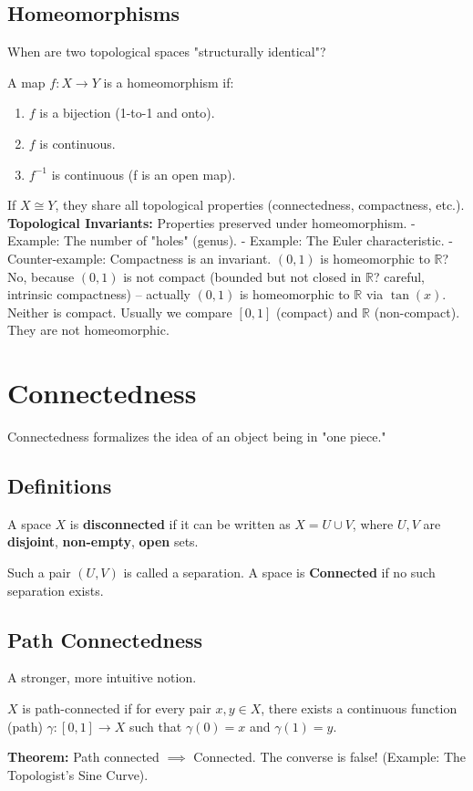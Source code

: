 \subsection{Homeomorphisms}
When are two topological spaces "structurally identical"?
\begin{definition}[Homeomorphism]
A map $f: X \to Y$ is a homeomorphism if:
\begin{enumerate}
    \item $f$ is a bijection (1-to-1 and onto).
    \item $f$ is continuous.
    \item $f^{-1}$ is continuous (f is an open map).
\end{enumerate}
\end{definition}
If $X \cong Y$, they share all topological properties (connectedness, compactness, etc.).
\textbf{Topological Invariants:} Properties preserved under homeomorphism.
- Example: The number of "holes" (genus).
- Example: The Euler characteristic.
- Counter-example: Compactness is an invariant. $(0, 1)$ is homeomorphic to $\mathbb{R}$? No, because $(0, 1)$ is not compact (bounded but not closed in $\mathbb{R}$? careful, intrinsic compactness) -- actually $(0, 1)$ is homeomorphic to $\mathbb{R}$ via $\tan(x)$. Neither is compact. Usually we compare $[0, 1]$ (compact) and $\mathbb{R}$ (non-compact). They are not homeomorphic.

\section{Connectedness}

Connectedness formalizes the idea of an object being in "one piece."

\subsection{Definitions}
\begin{definition}[Disconnected]
A space $X$ is \textbf{disconnected} if it can be written as $X = U \cup V$, where $U, V$ are \textbf{disjoint}, \textbf{non-empty}, \textbf{open} sets.
\end{definition}
Such a pair $(U, V)$ is called a separation.
A space is \textbf{Connected} if no such separation exists.

\subsection{Path Connectedness}
A stronger, more intuitive notion.
\begin{definition}
$X$ is path-connected if for every pair $x, y \in X$, there exists a continuous function (path) $\gamma: [0, 1] \to X$ such that $\gamma(0) = x$ and $\gamma(1) = y$.
\end{definition}
\textbf{Theorem:} Path connected $\implies$ Connected.
The converse is false! (Example: The Topologist's Sine Curve).

